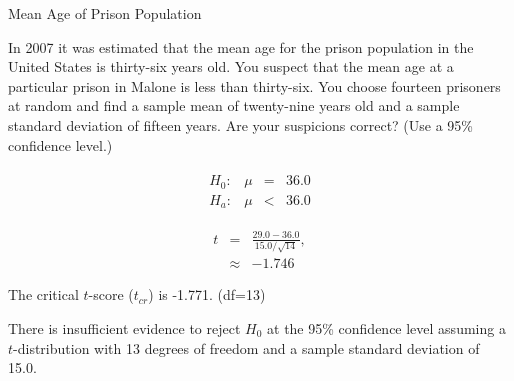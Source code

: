 \begin{frame}{Mean Age of Prison Population}

  In 2007 it was estimated that the mean age for the prison population
  in the United States is thirty-six years old. You suspect that the
  mean age at a particular prison in Malone is less than
  thirty-six. You choose fourteen prisoners at random and find a
  sample mean of twenty-nine years old and a {\color{red}sample standard deviation}
  of fifteen years. Are your suspicions correct? (Use a 95\%
  confidence level.)

  {
    \begin{eqnarray*}
      \begin{array}{lrcl}
        H_0: & \mu & = & 36.0 \\
        H_a: & \mu & < & 36.0
      \end{array}
    \end{eqnarray*}
  }

  {
    \begin{eqnarray*}
      t & = & \frac{29.0-36.0}{15.0/\sqrt{14}}, \\
      & \approx & -1.746
    \end{eqnarray*}
  }

  {
    The critical $t$-score ($t_{cr}$) is -1.771. (df=13)
  }

  {

    {\color{red}
      There is insufficient evidence to reject $H_0$ at the 95\%
      confidence level assuming a $t$-distribution with 13 degrees of
      freedom and a {\color{red}sample standard deviation} of 15.0.
    }

  }

  
\end{frame}



